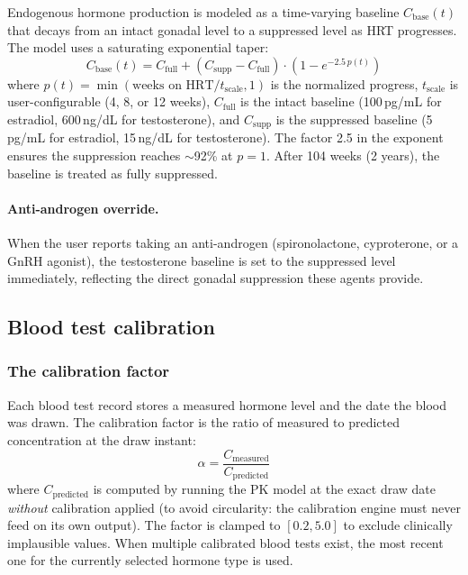 \documentclass[11pt,a4paper]{article}
\begin{document}
Endogenous hormone production is modeled as a time-varying baseline
$C_{\text{base}}(t)$ that decays from an intact gonadal level to a
suppressed level as HRT progresses. The model uses a saturating
exponential taper:
\begin{equation}
C_{\text{base}}(t) = C_{\text{full}} + (C_{\text{supp}} - C_{\text{full}}) \cdot \left(1 - e^{-2.5 \, p(t)}\right)
\label{eq:baseline}
\end{equation}
where $p(t) = \min(\text{weeks on HRT} / t_{\text{scale}}, 1)$ is the
normalized progress, $t_{\text{scale}}$ is user-configurable (4, 8, or
12 weeks), $C_{\text{full}}$ is the intact baseline (100\,pg/mL for
estradiol, 600\,ng/dL for testosterone), and $C_{\text{supp}}$ is the
suppressed baseline (5\,pg/mL for estradiol, 15\,ng/dL for
testosterone). The factor 2.5 in the exponent ensures the suppression
reaches $\sim$92\% at $p = 1$. After 104 weeks (2 years), the baseline
is treated as fully suppressed.

\paragraph{Anti-androgen override.} When the user reports taking an
anti-androgen (spironolactone, cyproterone, or a GnRH agonist), the
testosterone baseline is set to the suppressed level immediately,
reflecting the direct gonadal suppression these agents provide.

\subsection{Blood test calibration}
\label{sec:calibration}

\subsubsection{The calibration factor}

Each blood test record stores a measured hormone level and the date the
blood was drawn. The calibration factor is the ratio of measured to
predicted concentration at the draw instant:
\begin{equation}
\alpha = \frac{C_{\text{measured}}}{C_{\text{predicted}}}
\label{eq:alpha}
\end{equation}
where $C_{\text{predicted}}$ is computed by running the PK model at the
exact draw date \emph{without} calibration applied (to avoid
circularity: the calibration engine must never feed on its own output).
The factor is clamped to $[0.2, 5.0]$ to exclude clinically implausible
values. When multiple calibrated blood tests exist, the most recent one
for the currently selected hormone type is used.
\end{document}
